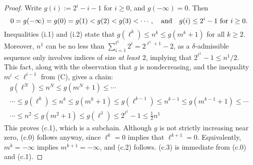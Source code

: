 \documentclass[10pt]{article}
\newcommand{\minDim}{m}
\begin{document}
\begin{KoszulSequenceCombinatorics}
\begin{proof}
Write $g(i):=2^i-i-1$ for $i\geq0$, and $g(-\infty)=0$. Then
\[0=g(-\infty)=g(0)=g(1)<g(2)<g(3)<\cdots,\quad \textup{and}\quad g(i)\leq 2^i-1 \textup{ for $i\geq0$}.\]
Inequalities \textup{(i.1)} and \textup{(i.2)} state that $g(\ell^k)\leq n^k\leq g(\minDim^k+1)$ for all $k\geq2$. %
Moreover, $n^1$ can be no less than $\sum_{i=1}^{\ell^1}2^i=2^{\ell^1+1}-2$, as a $\delta$-admissible sequence only involves indices of size \emph{at least $2$}, implying that $2^{\ell^1}-1\leq n^1/2$. This fact, along with the observation that $g$ is nondecreasing, and the inequality $m^i<\ell^{i-1}$ from \textup{(C)}, gives a chain:
\begin{multline*}
g(\ell^N)\leq n^N\leq g(\minDim^N+1)\leq\cdots\\\cdots \leq g(\ell^k)\leq n^k\leq g(\minDim^k+1)\leq g(\ell^{k-1})\leq n^{k-1}\leq g(\minDim^{k-1}+1)\leq\cdots\\
\cdots\leq n^2\leq g(\minDim^2+1)\leq g(\ell^{1})\leq 2^{\ell^1}-1\leq \tfrac{1}{2}n^1
\end{multline*}
This proves \textup{(c.1)}, which is a subchain. Although $g$ is not strictly increasing near zero, \textup{(c.0)} follows anyway, since $\ell^k=0$ implies that $\ell^{k+1}=0$. Equivalently, $m^k=-\infty$ implies $m^{k+1}=-\infty$, and \textup{(c.2)} follows. \textup{(c.3)} is immediate from \textup{(c.0)} and \textup{(c.1)}.


\end{proof}
\end{KoszulSequenceCombinatorics}
\end{document}
